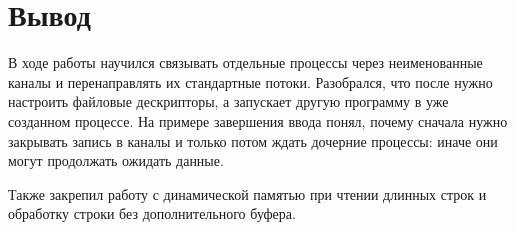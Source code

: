 \documentclass[12pt,a4paper]{article}
\newcommand{\code}[1]{\texttt{\detokenize{#1}}}
\begin{document}
\section*{Вывод}
В ходе работы научился связывать отдельные процессы через неименованные каналы и перенаправлять их стандартные потоки. Разобрался, что после \code{fork} нужно настроить файловые дескрипторы, а \code{execvp} запускает другую программу в уже созданном процессе. На примере завершения ввода понял, почему сначала нужно закрывать запись в каналы и только потом ждать дочерние процессы: иначе они могут продолжать ожидать данные.

Также закрепил работу с динамической памятью при чтении длинных строк и обработку строки без дополнительного буфера.
\end{document}
